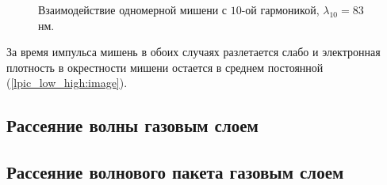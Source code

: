     \begin{figure}[htbp]
        \hfil
        \caption{Взаимодействие одномерной мишени с $10$-ой гармоникой, $\lambda_{10} = 83$ нм.}\label{lpic_low_high:image}
    \end{figure}

За время импульса мишень в обоих случаях разлетается слабо и электронная плотность в окрестности мишени остается в среднем постоянной (\autoref{lpic_low_high:image}).

\subsection{Рассеяние волны газовым слоем}

\subsection{Рассеяние волнового пакета газовым слоем}